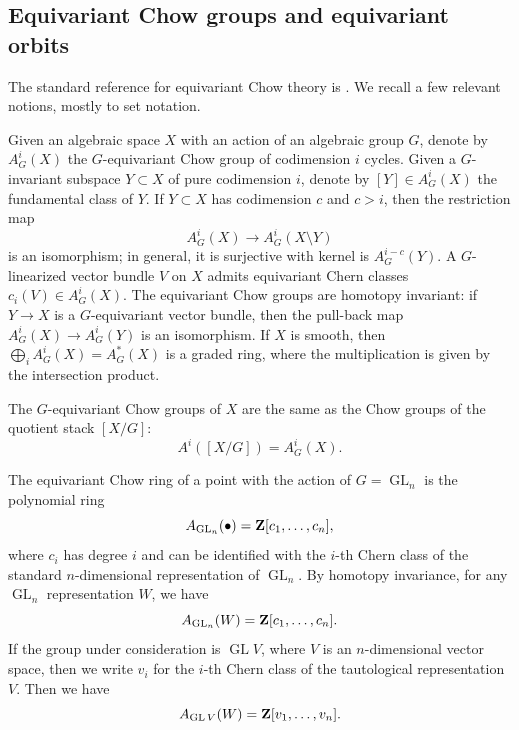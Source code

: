 \documentclass[reqno]{amsart}
\renewcommand{\to}{{\longrightarrow}}
\providecommand {\Z}{{\bf Z}}
\providecommand{\GL}{\operatorname{GL}}
\numberwithin{equation}{section}
\begin{document}
\subsection{Equivariant Chow groups and equivariant orbits}
The standard reference for equivariant Chow theory is \cite{edi.gra:98}.
We recall a few relevant notions, mostly to set notation.

Given an algebraic space $X$ with an action of an algebraic group $G$,
denote by $A^i_G(X)$ the $G$-equivariant Chow group of codimension $i$
cycles.  Given a $G$-invariant subspace $Y \subset X$ of pure
codimension $i$, denote by $[Y] \in A^i_G(X)$ the fundamental class of
$Y$.  If $Y \subset X$ has codimension $c$ and $c > i$, then the restriction map
\[ A^i_G(X) \to A^i_G(X \setminus Y)\]
is an isomorphism; in general, it is surjective with kernel is $A^{i-c}_G(Y)$.
A $G$-linearized vector bundle
$V$ on $X$ admits equivariant Chern classes $c_i(V) \in A^i_G(X)$.
The equivariant Chow groups are homotopy invariant: if $Y \to X$ is a
$G$-equivariant vector bundle, then the pull-back map
$A^i_G(X) \to A^i_G(Y)$ is an isomorphism.  If $X$ is smooth, then
$\bigoplus_i A^i_G(X) = A^*_G(X)$ is a graded ring, where the multiplication is given by the
intersection product.

The $G$-equivariant Chow groups of $X$ are the same as the Chow groups
of the quotient stack $[X/G]$:
\[ A^i\left( [X/G] \right) = A^i_G(X).\]

The equivariant Chow ring of a point with the action of $G = \GL_n$ is
the polynomial ring
\[ A_{\GL_n}(\bullet) = \Z[c_1,\dots, c_n],\] where $c_i$ has
degree $i$ and can be identified with the $i$-th Chern class of the
standard $n$-dimensional representation of $\GL_n$.  By homotopy
invariance, for any $\GL_n$ representation $W$, we have
\[ A_{\GL_n}(W) = \Z[c_1,\dots,c_n].\]
If the group under consideration is $\GL V$, where $V$ is an $n$-dimensional vector space,
then we write $v_i$ for the $i$-th Chern class of the tautological
representation $V$.  Then we have
\[ A_{\GL V}(W) = \Z[v_1,\dots,v_n].\]
\end{document}
